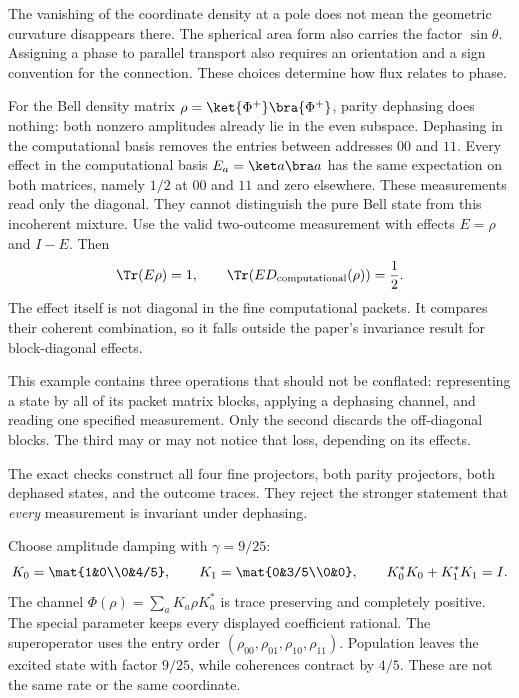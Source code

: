 The vanishing of the coordinate density at a pole does not mean the geometric curvature disappears there. The spherical area form also carries the factor $\sin\theta$. Assigning a phase to parallel transport also requires an orientation and a sign convention for the connection. These choices determine how flux relates to phase.

For the Bell density matrix $\rho=\ket{\Phi^+}\bra{\Phi^+}$, parity dephasing does nothing: both nonzero amplitudes already lie in the even subspace. Dephasing in the computational basis removes the entries between addresses $00$ and $11$.
Every effect in the computational basis $E_a=\ket a\bra a$ has the same expectation on both matrices, namely $1/2$ at $00$ and $11$ and zero elsewhere. These measurements read only the diagonal. They cannot distinguish the pure Bell state from this incoherent mixture.
Use the valid two-outcome measurement with effects $E=\rho$ and $I-E$. Then
\[
\Tr(E\rho)=1,\qquad
\Tr\!\left(E D_{\rm computational}(\rho)\right)=\frac12.
\]
The effect itself is not diagonal in the fine computational packets. It compares their coherent combination, so it falls outside the paper's invariance result for block-diagonal effects.

This example contains three operations that should not be conflated: representing a state by all of its packet matrix blocks, applying a dephasing channel, and reading one specified measurement. Only the second discards the off-diagonal blocks. The third may or may not notice that loss, depending on its effects.

The exact checks construct all four fine projectors, both parity projectors, both dephased states, and the outcome traces. They reject the stronger statement that \emph{every} measurement is invariant under dephasing.

Choose amplitude damping with $\gamma=9/25$:
\[
K_0=\mat{1&0\\0&4/5},\qquad
K_1=\mat{0&3/5\\0&0},\qquad K_0^*K_0+K_1^*K_1=I.
\]
The channel $\Phi(\rho)=\sum_aK_a\rho K_a^*$ is trace preserving and completely positive. The special parameter keeps every displayed coefficient rational.
The superoperator uses the entry order $(\rho_{00},\rho_{01},\rho_{10},\rho_{11})$. Population leaves the excited state with factor $9/25$, while coherences contract by $4/5$. These are not the same rate or the same coordinate.

